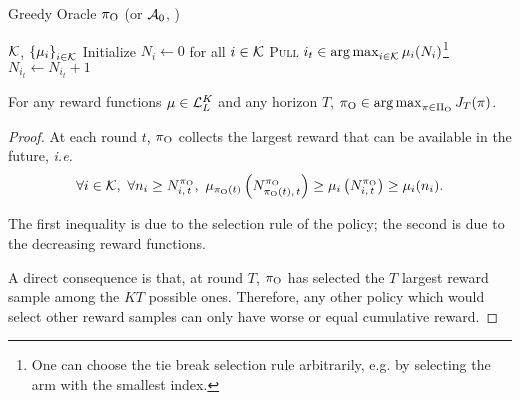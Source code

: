 \begin{minipage}{\textwidth}
\renewcommand*\footnoterule{}
\begin{savenotes}
\begin{algorithm}[H]
\caption{Greedy Oracle $\pi_{\rm O}$ (or $\mathcal{A}_{\rm 0}$, \citet{heidari2016tight})}
\label{alg:greedy-oracle}
\begin{algorithmic}[1]
	\Require $\mathcal{K}$, $\left\{\mu_i\right\}_{i \in \mathcal{K}}$
	\State Initialize $N_i \leftarrow 0$ for all $i \in \mathcal{K}$
		\State \textsc{Pull}  $i_t \in \operatorname*{arg\,max}_{i \in \mathcal{K}} \mu_i(N_{i})$\footnote{One can choose the tie break selection rule arbitrarily, e.g. by selecting the arm with the smallest index.}
		\State $N_{i_t} \leftarrow N_{i_t} + 1$
	\EndFor
\end{algorithmic}
\end{algorithm}
\end{savenotes}
\end{minipage}
\begin{proposition}
For any reward functions $\mu \in \mathcal{L}_L^K$ and any horizon $T$, $\pi_{\rm O} \in \operatorname*{arg\,max}_{\pi \in \Pi_{\rm O}} J_T(\pi)$.
\end{proposition}%
\begin{proof}

At each round $t$, $\pi_{\rm O}$ collects the largest reward that can be available in the future, \textit{i.e.} 
\[
\forall i \in \mathcal{K}, \ \forall n_i \geq N_{i,\,t}^{\pi_{\rm O}}, \ \mu_{\pi_{\rm O}(t)}\left(N_{\pi_{\rm O}(t),\,t}^{\pi_{\rm O}}\right) \geq\mu_{i}\left(N_{i,\,t}^{\pi_{\rm O}}\right)  \geq \mu_i(n_i).
\]

The first inequality is due to the selection rule of the policy; the second is due to the decreasing reward functions. 

A direct consequence is that, at round $T$, $\pi_{\rm O}$ has selected the $T$ largest reward sample among the $KT$ possible ones. Therefore, any other policy which would select other reward samples can only have worse or equal cumulative reward. 
\end{proof}

